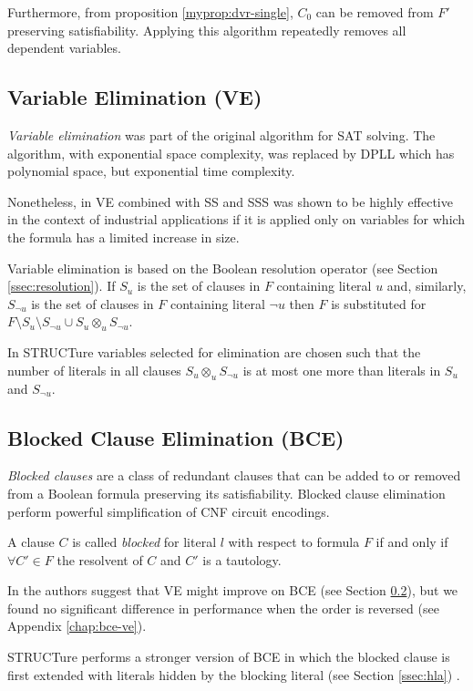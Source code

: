 Furthermore, from proposition \ref{myprop:dvr-single}, $C_0$ can be
removed from $F'$ preserving satisfiability. Applying this algorithm
repeatedly removes all dependent variables.


\subsection{Variable Elimination (VE)}
\label{ssec:ve}

\emph{Variable elimination} \cite{Davis:1960:CPQ:321033.321034}
was part of the original algorithm for SAT solving. The algorithm,
with exponential space complexity, was replaced by DPLL which
has polynomial space, but exponential time complexity.

Nonetheless, in
\cite{Subbarayan04niver:non,Een05effectivepreprocessing} VE combined
with SS and SSS was shown to be highly effective in the context
of industrial applications if it is applied only on variables for
which the formula has a limited increase in size.

Variable elimination is based on the Boolean resolution operator
(see Section \ref{ssec:resolution}). If $S_u$ is the set of clauses
in $F$ containing literal $u$ and, similarly, $S_{\neg u}$ is
the set of clauses in $F$ containing literal ${\neg u}$ then $F$
is substituted for $F \setminus S_u \setminus S_{\neg u} \cup S_u
\otimes_{u} S_{\neg u}$.

In STRUCTure variables selected for elimination are chosen such that
the number of literals in all clauses $S_u \otimes_{u} S_{\neg u}$
is at most one more than literals in $S_u$ and $S_{\neg u}$.


\subsection{Blocked Clause Elimination (BCE)}
\label{ssec:bce}

\emph{Blocked clauses} are a class of redundant clauses that can
be added to \cite{Kullmann:1999:NMD:312269.312271} or removed
from \cite{Jarvisalo_blockedclause} a Boolean formula preserving
its satisfiability. Blocked clause elimination perform powerful
simplification of CNF circuit encodings.

\begin{mydef}
  A clause $C$ is called \emph{blocked}
  for literal $l$ with respect to formula $F$ if and only if $\forall
  C' \in F$ the resolvent of $C$ and $C'$ is a tautology.
\end{mydef}

In \cite{Jarvisalo_blockedclause} the authors suggest that VE might
improve on BCE (see Section \ref{ssec:bce}), but we found no
significant difference in performance when the order is reversed
(see Appendix \ref{chap:bce-ve}).

STRUCTure performs a stronger version of BCE in which the blocked clause
is first extended with literals hidden by the blocking literal
(see Section \ref{ssec:hla}) \cite{Heule_coveredclause}.
